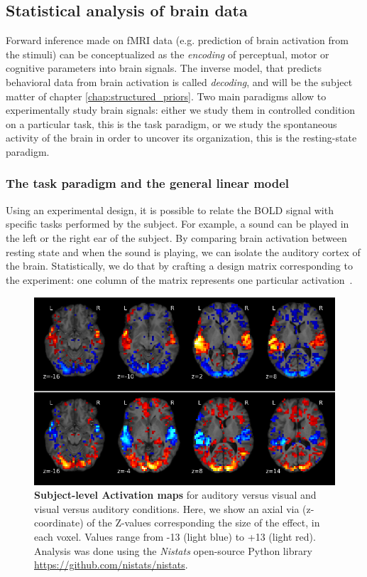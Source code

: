 \subsection{Statistical analysis of brain data}
\label{sec:glm}
Forward inference made on fMRI data (e.g. prediction of brain
activation from the stimuli) can be conceptualized as the \textit{encoding} of perceptual,
motor or cognitive parameters into brain signals. The inverse model, that
predicts behavioral data from brain activation is called \textit{decoding}, and will be the subject matter of chapter \ref{chap:structured_priors}. Two main paradigms allow to experimentally study brain
signals: either we study them in controlled condition on a particular task,
this is the task paradigm, or we study the spontaneous activity of the brain in
order to uncover its organization, this is the resting-state paradigm.

\subsubsection{The task paradigm and the general linear model}
Using an experimental design, it is possible to relate the BOLD signal with
specific tasks performed by the subject. For example, a sound can be played in
the left or the right ear of the subject. By comparing brain activation between
resting state and when the sound is playing, we can isolate the auditory cortex
of the brain.
Statistically, we do that by crafting a design matrix corresponding to the
experiment: one column of the matrix represents one particular activation~\citep{friston1994statistical}.

\begin{figure}
  \includegraphics[width=1\linewidth]{figures/activation.png}
  \caption{\textbf{Subject-level Activation maps } for auditory versus visual and visual versus auditory conditions. Here, we show an axial via (z-coordinate) of the Z-values corresponding the size of the effect, in each voxel. Values range from -13 (light blue) to +13 (light red). Analysis was done using the \textit{Nistats} open-source Python library \url{https://github.com/nistats/nistats}.}
\end{figure}

